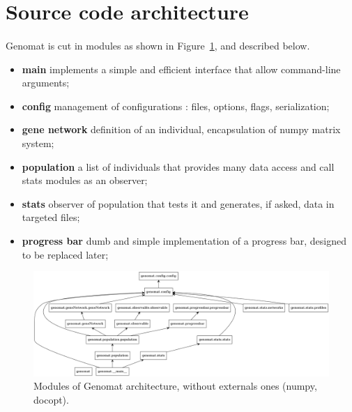 \documentclass[]{report} %
\begin{document}
\section*{Source code architecture}
	\paragraph*{}
        Genomat is cut in modules as shown in Figure~\ref{fig:umldiag}, and described below.
        \begin{itemize}
                \item \textbf{main} implements a simple and efficient interface that allow command-line arguments;
                \item \textbf{config} management of configurations : files, options, flags, serialization;
                \item \textbf{gene network} definition of an individual, encapsulation of numpy matrix system;
                \item \textbf{population} a list of individuals that provides many data access and call stats modules as an observer;
                \item \textbf{stats} observer of population that tests it and generates, if asked, data in targeted files;
                \item \textbf{progress bar} dumb and simple implementation of a progress bar, designed to be replaced later;
        \end{itemize}

        \begin{figure}[H] 
                \centering
                \includegraphics[width=\textwidth]{packages_genomat.png}
                \caption{\footnotesize Modules of Genomat architecture, without externals ones (numpy, docopt).}
                \label{fig:umldiag}
        \end{figure}
\end{document}
